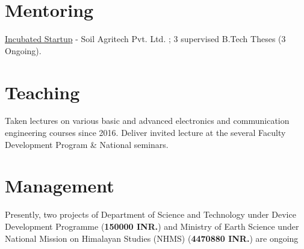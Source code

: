 \documentclass[margin,line,a4paper]{resume}
\begin{document}
\begin{resume}
\section{\mysidestyle Mentoring}
\href{http://thesoil.in/team.php}{Incubated Startup} - Soil Agritech Pvt. Ltd. ;  3 supervised B.Tech Theses (3 Ongoing).
\section{\mysidestyle Teaching}
Taken lectures on various basic and advanced electronics and communication engineering courses since 2016. Deliver invited lecture at the several Faculty Development Program \& National seminars.
\section{\mysidestyle Management}
%	
Presently, two projects of Department of Science and Technology under Device Development Programme (\textbf{150000 INR.}) and Ministry of Earth Science under National Mission on Himalayan Studies (NHMS) (\textbf{4470880 INR.}) are ongoing 

\end{resume}
\end{document}
